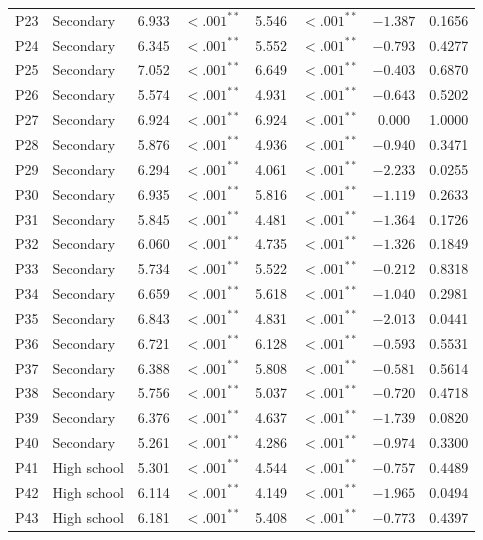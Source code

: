 \begin{longtable}{llcccccc}
P23 & Secondary & 6.933 & $<.001^{**}$ & 5.546 & $<.001^{**}$ & $-1.387$ & 0.1656 \\
P24 & Secondary & 6.345 & $<.001^{**}$ & 5.552 & $<.001^{**}$ & $-0.793$ & 0.4277 \\
P25 & Secondary & 7.052 & $<.001^{**}$ & 6.649 & $<.001^{**}$ & $-0.403$ & 0.6870 \\
P26 & Secondary & 5.574 & $<.001^{**}$ & 4.931 & $<.001^{**}$ & $-0.643$ & 0.5202 \\
P27 & Secondary & 6.924 & $<.001^{**}$ & 6.924 & $<.001^{**}$ & 0.000 & 1.0000 \\
P28 & Secondary & 5.876 & $<.001^{**}$ & 4.936 & $<.001^{**}$ & $-0.940$ & 0.3471 \\
P29 & Secondary & 6.294 & $<.001^{**}$ & 4.061 & $<.001^{**}$ & $-2.233$ & 0.0255 \\
P30 & Secondary & 6.935 & $<.001^{**}$ & 5.816 & $<.001^{**}$ & $-1.119$ & 0.2633 \\
P31 & Secondary & 5.845 & $<.001^{**}$ & 4.481 & $<.001^{**}$ & $-1.364$ & 0.1726 \\
P32 & Secondary & 6.060 & $<.001^{**}$ & 4.735 & $<.001^{**}$ & $-1.326$ & 0.1849 \\
P33 & Secondary & 5.734 & $<.001^{**}$ & 5.522 & $<.001^{**}$ & $-0.212$ & 0.8318 \\
P34 & Secondary & 6.659 & $<.001^{**}$ & 5.618 & $<.001^{**}$ & $-1.040$ & 0.2981 \\
P35 & Secondary & 6.843 & $<.001^{**}$ & 4.831 & $<.001^{**}$ & $-2.013$ & 0.0441 \\
P36 & Secondary & 6.721 & $<.001^{**}$ & 6.128 & $<.001^{**}$ & $-0.593$ & 0.5531 \\
P37 & Secondary & 6.388 & $<.001^{**}$ & 5.808 & $<.001^{**}$ & $-0.581$ & 0.5614 \\
P38 & Secondary & 5.756 & $<.001^{**}$ & 5.037 & $<.001^{**}$ & $-0.720$ & 0.4718 \\
P39 & Secondary & 6.376 & $<.001^{**}$ & 4.637 & $<.001^{**}$ & $-1.739$ & 0.0820 \\
P40 & Secondary & 5.261 & $<.001^{**}$ & 4.286 & $<.001^{**}$ & $-0.974$ & 0.3300 \\
\midrule
P41 & High school & 5.301 & $<.001^{**}$ & 4.544 & $<.001^{**}$ & $-0.757$ & 0.4489 \\
P42 & High school & 6.114 & $<.001^{**}$ & 4.149 & $<.001^{**}$ & $-1.965$ & 0.0494 \\
P43 & High school & 6.181 & $<.001^{**}$ & 5.408 & $<.001^{**}$ & $-0.773$ & 0.4397 \\

\end{longtable}

